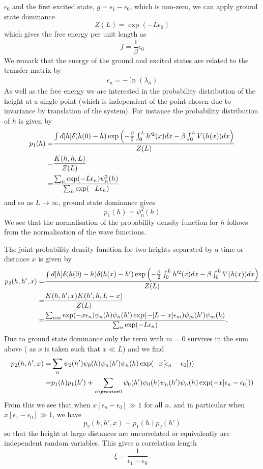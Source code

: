 $\epsilon_0$ and the first excited state, $g=\epsilon_1-\epsilon_0$, which is non-zero, we can apply ground state dominance 
\begin{equation}
    Z(L) =\exp(-L\epsilon_0)
\end{equation}
which gives the free energy per unit length as
\begin{equation}
    f=\frac{1}{\beta}\epsilon_0
\end{equation}
{\color{red} We remark that the energy of the ground and excited states are related to the transfer matrix by
\begin{align}
    \epsilon_n  = - \ln(\lambda_n)
\end{align}}
As well as the free energy we are interested in the probability distribution of the height at a single point (which is independent of the point chosen due to invariance by translation of the system). For instance the probability distribution of $h$ is given by
\begin{align}
p_1(h)=& \frac{\int d[h]\delta(h(0)-h)\exp\left(-\frac{\beta}{2}\int_0^L h'^2(x) dx -\beta\int_0^L  V(h(x)) dx\right)}{Z(L)}\nonumber \\
=& \frac{K(h,h,L)}{Z(L)} \nonumber \\
=& \frac{\sum_n \exp(-L\epsilon_n)\psi_n^2(h)}{\sum_n \exp(-L\epsilon_n)}
\end{align}
and so as $L\to\infty$, ground state dominance gives
\begin{equation}
    p_1(h)= \psi_0^2(h)
\end{equation}
We see that the normalisation of the probability density function for $h$ follows from the 
normalisation of the wave functions.

The joint probability density function for two heights separated by a time or distance $x$ is given by
\begin{align}
p_2(h,h',x)=& \frac{\int d[h]\delta(h(0)-h)\delta(h(x)-h')\exp\left(-\frac{\beta}{2}\int_0^L h'^2(x) dx -\beta\int_0^L  V(h(x)) dx\right)}{Z(L)}\nonumber \\
=& \frac{K(h,h',x)K(h',h,L-x)}{Z(L)} \nonumber \\
=& \frac{\sum_{nm} \exp(-x\epsilon_n)\psi_n(h)\psi_n(h')\exp(-[L-x]\epsilon_m)\psi_m(h')\psi_m(h)}{\sum_n \exp(-L\epsilon_n)}.
\end{align}
Due to ground state dominance only the term with $m=0$ survives in the sum above (
as $x$ is taken such that $x\ll L$) and we find
\begin{align}
p_2(h,h',x) =& \sum_{n} \psi_0(h')\psi_0(h)\psi_n(h')\psi_n(h)\exp(-x[\epsilon_n-\epsilon_0]))\nn
=& p_1(h)p_1(h') + \sum_{n\greater0} \psi_0(h')\psi_0(h)\psi_n(h')\psi_n(h)\exp(-x[\epsilon_n-\epsilon_0]))
\end{align}
From this we see that when $x[\epsilon_n-\epsilon_0] \gg1 $ for all $n$, and in particular when $x[\epsilon_1-\epsilon_0] \gg1$, we have 
\begin{equation}
    p_2(h,h',x) \sim p_1(h)p_2(h')
\end{equation}
so that the height at large distances are uncorrelated or equivalently are independent random variables. This gives a correlation length
\begin{equation}
    \xi = \frac{1}{\epsilon_1-\epsilon_0}.\label{clq}
\end{equation}


